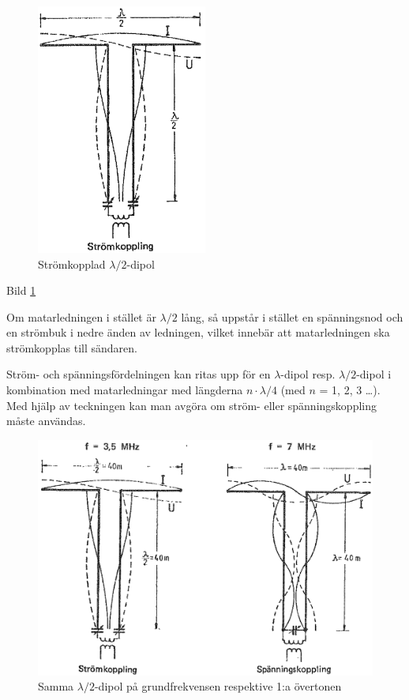 \begin{figure}
  \includegraphics[width=0.5\textwidth]{images/cropped_pdfs/bild_2_6-22.pdf}
  \caption{Strömkopplad $\lambda/2$-dipol}
  \label{fig:bildII6-22}
\end{figure}

Bild \ref{fig:bildII6-22}

Om matarledningen i stället är \(\lambda/2\) lång, så uppstår i
stället en spänningsnod och en strömbuk i nedre änden av ledningen,
vilket innebär att matarledningen ska strömkopplas till sändaren.

Ström- och spänningsfördelningen kan ritas upp för en
\(\lambda\)-dipol resp.  \(\lambda/2\)-dipol i kombination med
matarledningar med längderna \(n \cdot \lambda/4\) (med \(n\) = 1, 2,
3 \dots). Med hjälp av teckningen kan man avgöra om ström- eller
spänningskoppling måste användas.

\begin{figure}
  \includegraphics[width=\textwidth]{images/cropped_pdfs/bild_2_6-23.pdf}
  \caption{Samma $\lambda/2$-dipol på grundfrekvensen respektive 1:a övertonen}
  \label{fig:bildII6-23}
\end{figure}

